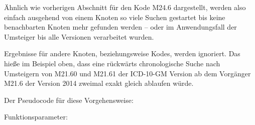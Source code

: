 Ähnlich wie vorherigen Abschnitt für den Kode M24.6 dargestellt, werden also einfach ausgehend von einem Knoten so viele Suchen gestartet bis keine benachbarten Knoten mehr gefunden werden -- oder im Anwendungsfall der Umsteiger bis alle Versionen verarbeitet wurden.

Ergebnisse für andere Knoten, beziehungsweise Kodes, werden ignoriert. Das hieße im Beispiel oben, dass eine rückwärts chronologische Suche nach Umsteigern von M21.60 und M21.61 der ICD-10-GM Version ab dem Vorgänger M21.6 der Version 2014 zweimal exakt gleich ablaufen würde. 

Der Pseudocode für diese Vorgehensweise:

Funktionsparameter:


